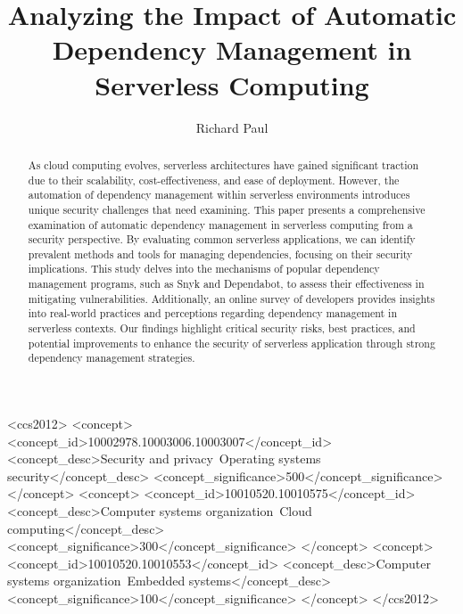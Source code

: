 \documentclass[sigconf]{acmart}
\begin{document}
\title{Analyzing the Impact of Automatic Dependency Management in Serverless Computing}
\author{Richard Paul}

\begin{abstract}
	As cloud computing evolves, serverless architectures have gained significant traction due to their scalability, cost-effectiveness, and ease of deployment. However, the automation of dependency management within serverless environments introduces unique security challenges that need examining. This paper presents a comprehensive examination of automatic dependency management in serverless computing from a security perspective. By evaluating common serverless applications, we can identify prevalent methods and tools for managing dependencies, focusing on their security implications. This study delves into the mechanisms of popular dependency management programs, such as Snyk and Dependabot, to assess their effectiveness in mitigating vulnerabilities. Additionally, an online survey of developers provides insights into real-world practices and perceptions regarding dependency management in serverless contexts. Our findings highlight critical security risks, best practices, and potential improvements to enhance the security of serverless application through strong dependency management strategies. 
\end{abstract}

\begin{CCSXML}
	<ccs2012>
	<concept>
	<concept_id>10002978.10003006.10003007</concept_id>
	<concept_desc>Security and privacy~Operating systems security</concept_desc>
	<concept_significance>500</concept_significance>
	</concept>
	<concept>
	<concept_id>10010520.10010575</concept_id>
	<concept_desc>Computer systems organization~Cloud computing</concept_desc>
	<concept_significance>300</concept_significance>
	</concept>
	<concept>
	<concept_id>10010520.10010553</concept_id>
	<concept_desc>Computer systems organization~Embedded systems</concept_desc>
	<concept_significance>100</concept_significance>
	</concept>
	</ccs2012>
\end{CCSXML}


\end{document}
